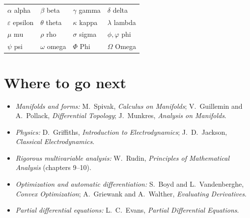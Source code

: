 \begin{center}
\begin{tabular}{llll}
\toprule
$\alpha$ alpha & $\beta$ beta & $\gamma$ gamma & $\delta$ delta \\
$\varepsilon$ epsilon & $\theta$ theta & $\kappa$ kappa & $\lambda$ lambda \\
$\mu$ mu & $\rho$ rho & $\sigma$ sigma & $\phi,\varphi$ phi \\
$\psi$ psi & $\omega$ omega & $\Phi$ Phi & $\Omega$ Omega \\
\bottomrule
\end{tabular}
\end{center}

\section{Where to go next}

\begin{itemize}
  \item \emph{Manifolds and forms:} M.\ Spivak, \emph{Calculus on Manifolds}; V.\ Guillemin and A.\ Pollack, \emph{Differential Topology}; J.\ Munkres, \emph{Analysis on Manifolds}.
  \item \emph{Physics:} D.\ Griffiths, \emph{Introduction to Electrodynamics}; J.\ D.\ Jackson, \emph{Classical Electrodynamics}.
  \item \emph{Rigorous multivariable analysis:} W.\ Rudin, \emph{Principles of Mathematical Analysis} (chapters 9--10).
  \item \emph{Optimization and automatic differentiation:} S.\ Boyd and L.\ Vandenberghe, \emph{Convex Optimization}; A.\ Griewank and A.\ Walther, \emph{Evaluating Derivatives}.
  \item \emph{Partial differential equations:} L.\ C.\ Evans, \emph{Partial Differential Equations}.
\end{itemize}
